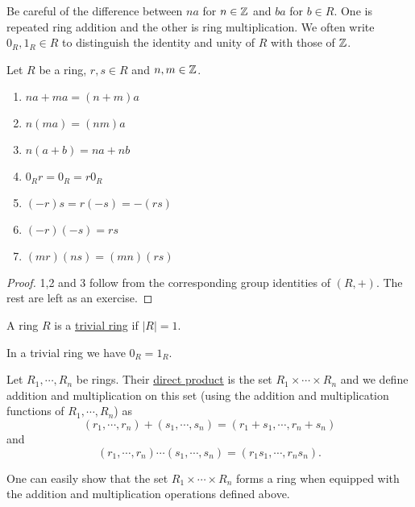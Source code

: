 \documentclass[11pt]{article}
\begin{document}
\begin{note}
    Be careful of the difference between $na$ for $n\in\mathbb{Z}$ and $ba$ for $b\in R$. One is repeated ring addition and the other is ring multiplication. We often write $0_R,1_R\in R$ to distinguish the identity and unity of $R$ with those of $\mathbb{Z}$.
\end{note}

\begin{proposition}
    Let $R$ be a ring, $r,s\in R$ and $n,m\in\mathbb{Z}$.
    \begin{enumerate}
        \item$na+ma=(n+m)a$
        \item$n(ma)=(nm)a$
        \item$n(a+b)=na+nb$
        \item$0_Rr=0_R=r0_R$
        \item$(-r)s=r(-s)=-(rs)$
        \item$(-r)(-s)=rs$
        \item$(mr)(ns)=(mn)(rs)$
    \end{enumerate}
\end{proposition}

\begin{proof}
    1,2 and 3 follow from the corresponding group identities of $(R,+)$. The rest are left as an exercise.
\end{proof}

\begin{definition}
    A ring $R$ is a \ul{trivial ring} if $|R|=1$.
\end{definition}

\begin{remark}
    In a trivial ring we have $0_R=1_R$.
\end{remark}

\begin{definition}
    Let $R_1,\cdots,R_n$ be rings. Their \ul{direct product} is the set $R_1\times\cdots\times R_n$ and we define addition and multiplication on this set (using the addition and multiplication functions of $R_1,\cdots,R_n$) as
    \[(r_1,\cdots,r_n)+(s_1,\cdots,s_n)=(r_1+s_1,\cdots,r_n+s_n)\]
    and
    \[(r_1,\cdots,r_n)\cdots(s_1,\cdots,s_n)=(r_1s_1,\cdots,r_ns_n).\]
\end{definition}

\begin{note}
    One can easily show that the set $R_1\times\cdots\times R_n$ forms a ring when equipped with the addition and multiplication operations defined above.
\end{note}
\end{document}
